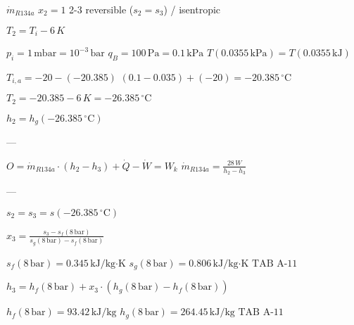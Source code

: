 \( \dot{m}_{R134a} \)  
\( x_2 = 1 \)  
2-3 reversible (\( s_2 = s_3 \)) / isentropic  

\( T_2 = T_i - 6 \, K \)  

\( p_i = 1 \, \text{mbar} = 10^{-3} \, \text{bar} \)  
\( q_B = 100 \, \text{Pa} = 0.1 \, \text{kPa} \)  
\( T(0.0355 \, \text{kPa}) = T(0.0355 \, \text{kJ}) \)  

\( T_{i,a} = -20 - (-20.385) \)  
\( (0.1 - 0.035) + (-20) = -20.385 \, ^\circ \text{C} \)  

\( T_2 = -20.385 - 6 \, K = -26.385 \, ^\circ \text{C} \)  

\( h_2 = h_g(-26.385 \, ^\circ \text{C}) \)  

---

\( O = \dot{m}_{R134a} \cdot (h_2 - h_3) + \dot{Q} - \dot{W} = W_k \)  
\( \dot{m}_{R134a} = \frac{28 \, W}{h_2 - h_3} \)  

---

\( s_2 = s_3 = s(-26.385 \, ^\circ \text{C}) \)  

\( x_3 = \frac{s_3 - s_f(8 \, \text{bar})}{s_g(8 \, \text{bar}) - s_f(8 \, \text{bar})} \)  

\( s_f(8 \, \text{bar}) = 0.345 \, \text{kJ/kg·K} \)  
\( s_g(8 \, \text{bar}) = 0.806 \, \text{kJ/kg·K} \)  
\( \text{TAB A-11} \)  

\( h_3 = h_f(8 \, \text{bar}) + x_3 \cdot (h_g(8 \, \text{bar}) - h_f(8 \, \text{bar})) \)  

\( h_f(8 \, \text{bar}) = 93.42 \, \text{kJ/kg} \)  
\( h_g(8 \, \text{bar}) = 264.45 \, \text{kJ/kg} \)  
\( \text{TAB A-11} \)